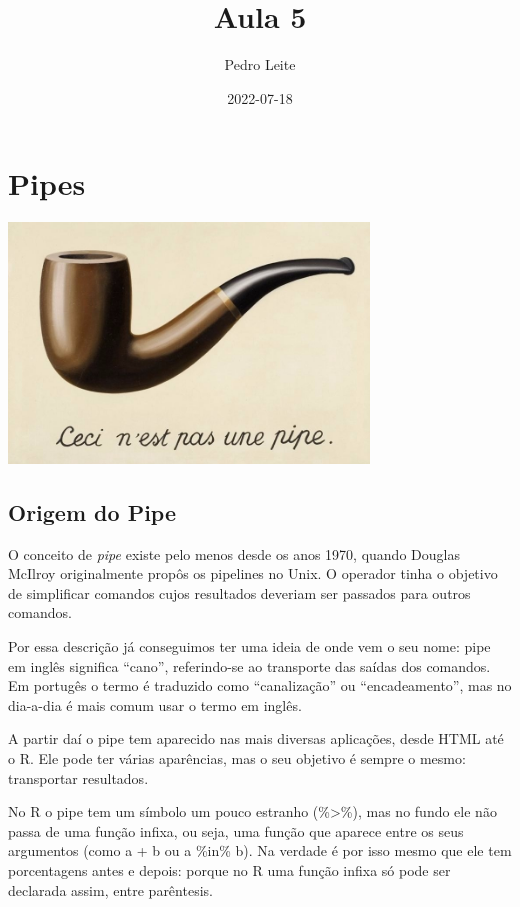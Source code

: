 \documentclass[
]{book}
\title{Aula 5}
\author{Pedro Leite}
\date{2022-07-18}
\begin{document}
\maketitle

{
\setcounter{tocdepth}{1}
\tableofcontents
}
\hypertarget{pipes}{%
\chapter{Pipes}\label{pipes}}

\begin{center}\includegraphics[width=3.77in]{figuras/ceci_pipe} \end{center}

\hypertarget{origem-do-pipe}{%
\section{Origem do Pipe}\label{origem-do-pipe}}

O conceito de \emph{pipe} existe pelo menos desde os anos 1970, quando Douglas McIlroy originalmente propôs os pipelines no Unix. O operador tinha o objetivo de simplificar comandos cujos resultados deveriam ser passados para outros comandos.

Por essa descrição já conseguimos ter uma ideia de onde vem o seu nome: pipe em inglês significa ``cano'', referindo-se ao transporte das saídas dos comandos. Em portugês o termo é traduzido como ``canalização'' ou ``encadeamento'', mas no dia-a-dia é mais comum usar o termo em inglês.

A partir daí o pipe tem aparecido nas mais diversas aplicações, desde HTML até o R. Ele pode ter várias aparências, mas o seu objetivo é sempre o mesmo: transportar resultados.

No R o pipe tem um símbolo um pouco estranho (\%\textgreater\%), mas no fundo ele não passa de uma função infixa, ou seja, uma função que aparece entre os seus argumentos (como a + b ou a \%in\% b). Na verdade é por isso mesmo que ele tem porcentagens antes e depois: porque no R uma função infixa só pode ser declarada assim, entre parêntesis.
\end{document}
